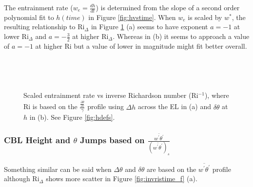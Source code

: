 \clearpage

The entrainment rate ($w_{e}= \frac{dh}{dt}$) is determined from the slope of a second order polynomial fit to $h(time)$ in Figure \ref{fig:hvstime}.  When $w_{e}$ is scaled by $w^{*}$, the resulting relationship to \acs{Ri}$_{\Delta}$ 
in Figure \ref{fig:weinvri} (a) seems to have exponent $a = -1$ at lower \acs{Ri}$_{\Delta}$ and $a = -\frac{3}{2}$ at higher \acs{Ri}$_{\Delta}$.  Whereas in (b) it seems to approach a value of $a = -1$ at higher \acs{Ri} but a value of lower in magnitude might fit better overall. \\    

\begin{figure}[htbp]
\begin{minipage}[b]{0.5\linewidth}
        \\
        \end{minipage}             
\quad
\begin{minipage}[b]{0.5\linewidth}
        \\       
       \end{minipage}
        \caption[Scaled entrainment rate vs inverse Richardson number (i)]{Scaled entrainment rate vs inverse Richardson number (\acs{Ri}$^{-1}$), where \acs{Ri} is based on the $\frac{\frac{\partial \overline{\theta}}{\partial z}}{\gamma}$ profile using $\Delta h$ across the \acs{EL} in (a) and $\delta \theta$ at $h$ in (b). See Figure \ref{fig:hdefs}.}
        \label{fig:weinvri}
\end{figure}

\clearpage

\subsubsection{\acs{CBL} Height and $\theta$ Jumps based on $\frac{\overline{w^{'}\theta^{'}}}{(\overline{w^{'}\theta^{'}})_{s}}$}

Something similar can be said when $\Delta \theta$ and $\delta \theta$ are based on the $\overline{w^{'}\theta^{'}}$ profile although \acs{Ri}$_{\Delta}$ shows more scatter in Figure \ref{fig:invristime_f} (a).

